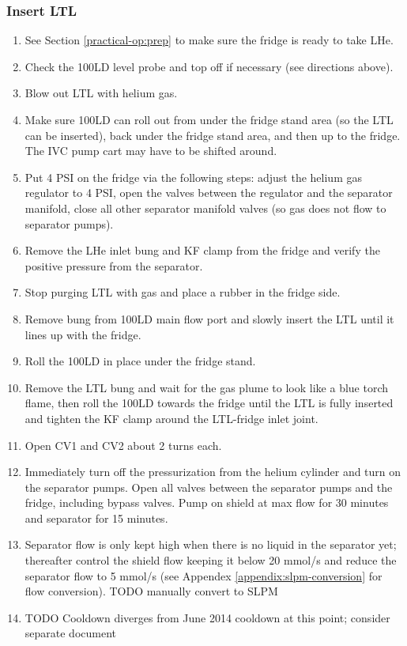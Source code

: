 \subsubsection{Insert LTL}
\begin{enumerate}
 \item See Section \ref{practical-op:prep} to make sure the fridge is ready to take LHe.
 \item Check the 100LD level probe and top off if necessary (see directions above).
 \item Blow out LTL with helium gas.
 \item Make sure 100LD can roll out from under the fridge stand area (so the LTL can be inserted), back under the fridge stand area, and then up to the fridge.  The IVC pump cart may have to be shifted around.
 \item Put 4 PSI on the fridge via the following steps: adjust the helium gas regulator to 4 PSI, open the valves between the regulator and the separator manifold, close all other separator manifold valves (so gas does not flow to separator pumps).
 \item Remove the LHe inlet bung and KF clamp from the fridge and verify the positive pressure from the separator.
 \item Stop purging LTL with gas and place a rubber in the fridge side.
 \item Remove bung from 100LD main flow port and slowly insert the LTL until it lines up with the fridge.
 \item Roll the 100LD in place under the fridge stand.
 \item Remove the LTL bung and wait for the gas plume to look like a blue torch flame, then roll the 100LD towards the fridge until the LTL is fully inserted and tighten the KF clamp around the LTL-fridge inlet joint.
 \item Open CV1 and CV2 about 2 turns each.
 \item Immediately turn off the pressurization from the helium cylinder and turn on the separator pumps.  Open all valves between the separator pumps and the fridge, including bypass valves.  Pump on shield at max flow for 30 minutes and separator for 15 minutes\cite{tapio-cooldown-procedure}.
 \item Separator flow is only kept high when there is no liquid in the separator yet; thereafter control the shield flow keeping it below 20 mmol/s and reduce the separator flow to 5 mmol/s (see Appendex \ref{appendix:slpm-conversion} for flow conversion).  TODO manually convert to SLPM
 \item TODO Cooldown diverges from June 2014 cooldown at this point; consider separate document
\end{enumerate}


